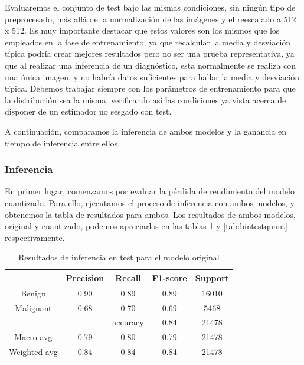 Evaluaremos el conjunto de test bajo las mismas condiciones, sin ningún tipo de preprocesado, más allá de la normalización de las imágenes y el reescalado a 512 x 512. Es muy importante destacar que estos valores son los mismos que los empleados en la fase de entrenamiento, ya que recalcular la media y desviación típica podría crear mejores resultados pero no ser una prueba representativa, ya que al realizar una inferencia de un diagnóstico, esta normalmente se realiza con una única imagen, y no habría datos suficientes para hallar la media y desviación típica. Debemos trabajar siempre con los parámetros de entrenamiento para que la distribución sea la misma, verificando así las condiciones ya vista acerca de disponer de un estimador no sesgado con test.

A continuación, comparamos la inferencia de ambos modelos y la ganancia en tiempo de inferencia entre ellos.

\subsubsection{Inferencia}

En primer lugar, comenzamos por evaluar la pérdida de rendimiento del modelo cuantizado. Para ello, ejecutamos el proceso de inferencia con ambos modelos, y obtenemos la tabla de resultados para ambos.
Los resultados de ambos modelos, original y cuantizado, podemos apreciarlos en las tablas \ref{tab:bintestorig} y \ref{tab:bintestquant} respectivamente.

\begin{table}[!ht]
	\centering
	\begin{tabular}{|c|c|c|c|c|}
		\hline
		~ & Precision & Recall & F1-score & Support \\ \hline
		Benign & 0.90 & 0.89 & 0.89 & 16010 \\ 
		Malignant & 0.68 & 0.70 & 0.69 & 5468 \\ \hline
		~ & ~ & accuracy & 0.84 & 21478 \\ \hline
		Macro avg & 0.79 & 0.80 & 0.79 & 21478 \\ 
		Weighted avg & 0.84 & 0.84 & 0.84 & 21478 \\ \hline
	\end{tabular}
	\caption{Resultados de inferencia en test para el modelo original}
	\label{tab:bintestorig}
\end{table}



